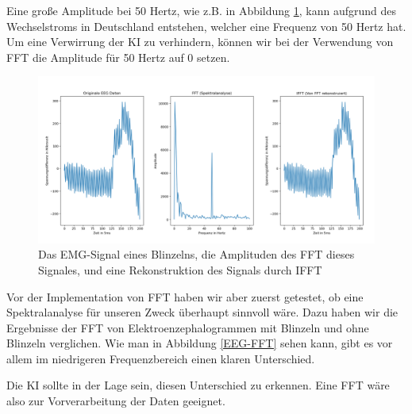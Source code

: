 \documentclass[11pt]{scrartcl}
\begin{document}
	Eine große Amplitude bei 50 Hertz, wie z.B. in Abbildung \ref{EEG-IFFT}, kann aufgrund des Wechselstroms in Deutschland entstehen, welcher eine Frequenz von 50 Hertz hat. \cite{Praktikum} Um eine Verwirrung der KI zu verhindern, können wir bei der Verwendung von FFT die Amplitude für 50 Hertz auf 0 setzen.

	\begin{figure}[h!]
		\includegraphics[width=\textwidth]{pictures/blink_fft_ifft.png}
		\caption{Das EMG-Signal eines Blinzelns, die Amplituden des FFT dieses Signales, und eine Rekonstruktion des Signals durch IFFT}
		\label{EEG-IFFT}
	\end{figure}

	Vor der Implementation von FFT haben wir aber zuerst getestet, ob eine Spektralanalyse für unseren Zweck überhaupt sinnvoll wäre. Dazu haben wir die Ergebnisse der FFT von Elektroenzephalogrammen mit Blinzeln und ohne Blinzeln verglichen. Wie man in Abbildung \ref{EEG-FFT} sehen kann, gibt es vor allem im niedrigeren Frequenzbereich einen klaren Unterschied.

	Die KI sollte in der Lage sein, diesen Unterschied zu erkennen. Eine FFT wäre also zur Vorverarbeitung der Daten geeignet.

\end{document}

